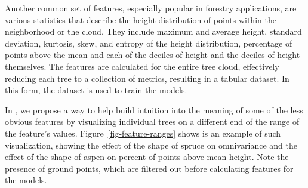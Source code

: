 Another common set of features, especially popular in forestry applications, are various statistics that describe the height distribution of points within the neighborhood or the cloud.
They include maximum and average height, standard deviation, kurtosis, skew, and entropy of the height distribution, percentage of points above the mean and each of the deciles of height and the deciles of height themselves.
The features are calculated for the entire tree cloud, effectively reducing each tree to a collection of metrics, resulting in a tabular dataset.
In this form, the dataset is used to train the models.

In \citet{dubrovinExplorationPropertiesPoint2024}, we propose a way to help build intuition into the meaning of some of the less obvious features by visualizing individual trees on a different end of the range of the feature's values.
Figure~\ref{fig-feature-ranges} shows is an example of such visualization, showing the effect of the shape of spruce on omnivariance and the effect of the shape of aspen on percent of points above mean height.
Note the presence of ground points, which are filtered out before calculating features for the models.

